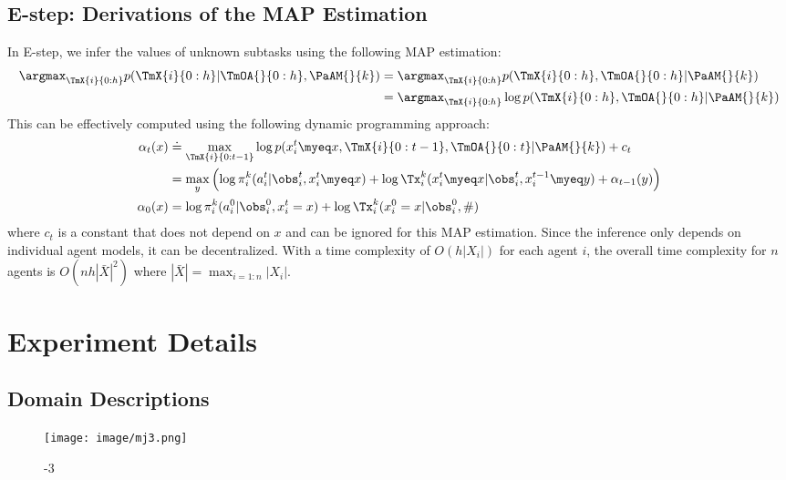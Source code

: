 \subsection{E-step: Derivations of the MAP Estimation}
In E-step, we infer the values of unknown subtasks using the following MAP estimation:
\begin{align*}
\argmax_{\TmX{i}{0:h}} p(\TmX{i}{0:h}|\TmOA{}{0:h}, \PaAM{}{k}) &=\argmax_{\TmX{i}{0:h}} p(\TmX{i}{0:h}, \TmOA{}{0:h}| \PaAM{}{k}) \\
&= \argmax_{\TmX{i}{0:h}}\log p(\TmX{i}{0:h}, \TmOA{}{0:h}| \PaAM{}{k}) 
\end{align*}
This can be effectively computed using the following dynamic programming approach:
\begin{align*}
\alpha_t(x) &\doteq \max_{\TmX{i}{0:t-1}}\log p(x_i^t\myeq x, \TmX{i}{0:t-1}, \TmOA{}{0:t}| \PaAM{}{k})  + c_t\\
&=\max_{y}\left( \log \pi_i^k(a_i^t|\obs_i^t, x_i^t\myeq x) + \log \Tx_i^k(x_i^t\myeq x|\obs_i^t, x_i^{t-1}\myeq y) + \alpha_{t-1}(y)\right)\\
\alpha_0(x) &= \log \pi_i^k(a_i^0|\obs_i^0, x_i^t=x) + \log\Tx_i^k(x_i^0=x|\obs_i^0, \#)
\end{align*}
where $c_t$ is a constant that does not depend on $x$ and can be ignored for this MAP estimation.
Since the inference only depends on individual agent models, it can be decentralized. With a time complexity of $O(h|X_i|)$ for each agent $i$, the overall time complexity for $n$ agents is $O(nh|\bar{X}|^2)$ where $|\bar{X}|=\max_{i=1:n}|X_i|$.
\clearpage
\section{Experiment Details}
\subsection{Domain Descriptions}
\label{sec. domain descriptions }



\begin{wrapfigure}{r}{0.27\textwidth}
  \centering
  \texttt{[image: image/mj3.png]}
  \caption{\simplemulti-$3$}
  \label{fig: mj3}
\end{wrapfigure}
